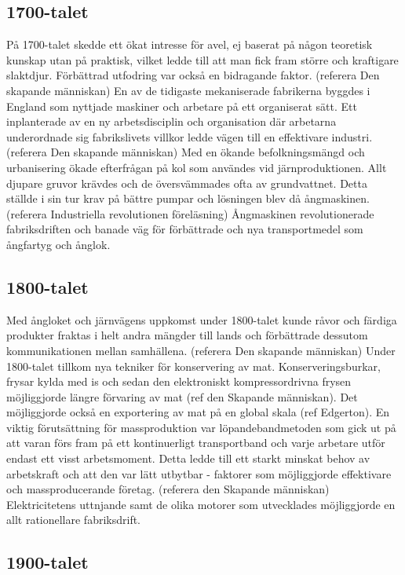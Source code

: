 \subsection{1700-talet}
På 1700-talet skedde ett ökat intresse för avel, ej baserat på någon teoretisk kunskap utan på praktisk, vilket ledde till att man fick fram större och kraftigare slaktdjur. Förbättrad utfodring var också en bidragande faktor. (referera Den skapande människan)
\newline
\newline
En av de tidigaste mekaniserade fabrikerna byggdes i England som nyttjade maskiner och arbetare på ett organiserat sätt. Ett inplanterade av en ny arbetsdisciplin och organisation där arbetarna underordnade sig fabrikslivets villkor ledde vägen till en effektivare industri. (referera Den skapande människan) 
\newline
\newline
Med en ökande befolkningsmängd och urbanisering ökade efterfrågan på kol som användes vid järnproduktionen. Allt djupare gruvor krävdes och de översvämmades ofta av grundvattnet. Detta ställde i sin tur krav på bättre pumpar och lösningen blev då ångmaskinen. 
(referera Industriella revolutionen föreläsning)
\newline
\newline
Ångmaskinen revolutionerade fabriksdriften och banade väg för förbättrade och nya transportmedel som ångfartyg och ånglok. 

\subsection{1800-talet}
Med ångloket och järnvägens uppkomst under 1800-talet kunde råvor och färdiga produkter fraktas i helt andra mängder till lands och förbättrade dessutom kommunikationen mellan samhällena. (referera Den skapande människan)
\newline
\newline
Under 1800-talet tillkom nya tekniker för konservering av mat. Konserveringsburkar, frysar kylda med is och sedan den elektroniskt kompressordrivna frysen möjliggjorde längre förvaring av mat (ref den Skapande människan). Det möjliggjorde också en exportering av mat på en global skala (ref Edgerton). 
\newline
\newline
En viktig förutsättning för massproduktion var löpandebandmetoden som gick ut på att varan förs fram på ett kontinuerligt transportband och varje arbetare utför endast ett visst arbetsmoment. Detta ledde till ett starkt minskat behov av arbetskraft och att den var lätt utbytbar - faktorer som möjliggjorde effektivare och massproducerande företag. (referera den Skapande människan) 
\newline
\newline
Elektricitetens uttnjande samt de olika motorer som utvecklades möjliggjorde en allt rationellare fabriksdrift.

\subsection{1900-talet}
 



